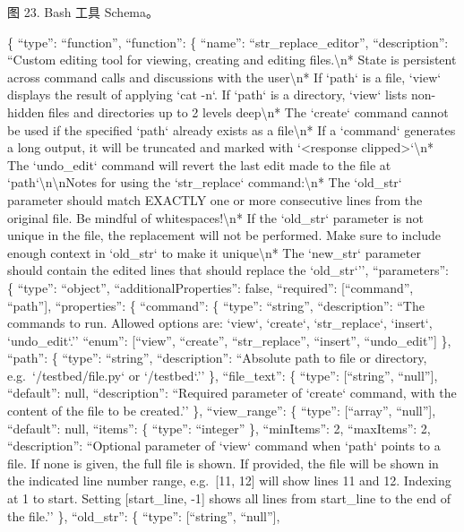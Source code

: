 \documentclass[
  10
]{article}
\newcounter{none} %
\begin{document}
图 23. Bash 工具 Schema。



\{ ``type'': ``function'', ``function'': \{ ``name'':
``str\_replace\_editor'', ``description'': ``Custom editing tool for
viewing, creating and editing files.\textbackslash{}n* State is persistent across
command calls and discussions with the user\textbackslash{}n* If `path` is a file,
`view` displays the result of applying `cat -n`. If `path` is a
directory, `view` lists non-hidden files and directories up to 2 levels
deep\textbackslash{}n* The `create` command cannot be used if the specified `path`
already exists as a file\textbackslash{}n* If a `command` generates a long output, it
will be truncated and marked with `<response clipped>`\textbackslash{}n* The
`undo\_edit` command will
revert the last edit made to the file at `path`\textbackslash{}n\textbackslash{}nNotes for using the
`str\_replace` command:\textbackslash{}n* The `old\_str` parameter should match EXACTLY
one or more consecutive lines from the original file. Be mindful of
whitespaces!\textbackslash{}n* If the `old\_str` parameter is not unique in the file,
the replacement will not be performed. Make sure to include enough
context in `old\_str` to make it unique\textbackslash{}n* The `new\_str` parameter
should contain the edited lines that should replace the
`old\_str`'', ``parameters'': \{ ``type'': ``object'',
``additionalProperties'': false, ``required'': {[}``command'',
``path''{]}, ``properties'': \{ ``command'': \{ ``type'': ``string'',
``description'': ``The commands to run. Allowed options are: `view`,
`create`, `str\_replace`, `insert`, `undo\_edit`.'' ``enum'':
{[}``view'', ``create'', ``str\_replace'', ``insert'', ``undo\_edit''{]}
\}, ``path'': \{ ``type'': ``string'', ``description'': ``Absolute path
to file or directory, e.g.~`/testbed/file.py` or `/testbed`.'' \},
``file\_text'': \{ ``type'': {[}``string'', ``null''{]}, ``default'':
null, ``description'': ``Required parameter of `create` command, with
the content of the file to be created.'' \}, ``view\_range'': \{
``type'': {[}``array'', ``null''{]}, ``default'': null, ``items'': \{
``type'': ``integer'' \}, ``minItems'': 2, ``maxItems'': 2,
``description'': ``Optional parameter of `view` command when `path`
points to a file. If none is given, the full file is shown. If provided,
the file will be shown in the indicated line number range, e.g.~{[}11,
12{]} will show lines 11 and 12. Indexing at 1 to start. Setting
{[}start\_line, -1{]} shows all lines from start\_line to the end of the
file.'' \}, ``old\_str'': \{ ``type'': {[}``string'', ``null''{]},
\end{document}
